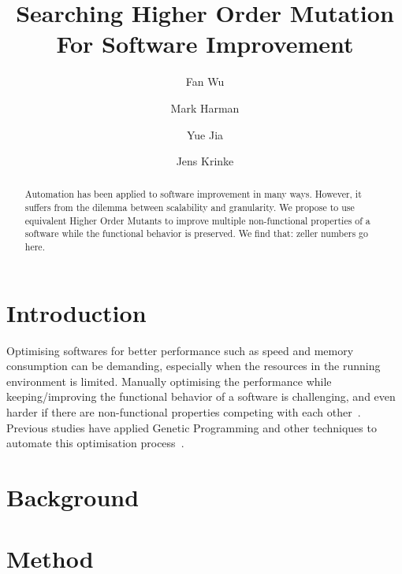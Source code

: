 \documentclass[oribibl]{llncs}
\begin{document}
\title{Searching Higher Order Mutation For Software Improvement}

\author{Fan Wu         \and
		Mark Harman        \and
		Yue Jia         \and
		Jens Krinke
}



\maketitle

\begin{abstract}
Automation has been applied to software improvement in many ways.
However, it suffers from the dilemma between scalability and granularity.
We propose to use equivalent Higher Order Mutants to improve multiple non-functional properties of a software while the functional behavior is preserved.
We find that: zeller numbers go here.
\end{abstract}

\section{Introduction}
\label{sec_intro}

Optimising softwares for better performance such as speed and memory consumption can be demanding, especially when the resources in the running environment is limited.
Manually optimising the performance while keeping/improving the functional behavior of a software is challenging, 
and even harder if there are non-functional properties competing with each other~\cite{Harman:2012:GCC:2351676.2351678}.
Previous studies have applied Genetic Programming and other techniques to automate this optimisation process~\cite{6035728, geneticimprovementJP, Wu:2015:DPO:2739480.2754648}.


\section{Background}
\label{sec_back}

\section{Method}
\label{sec_method}
\end{document}
